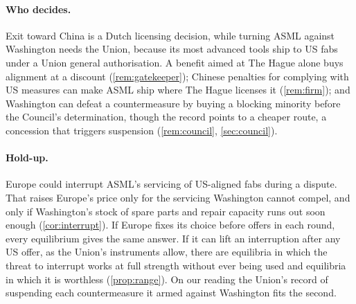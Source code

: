 \paragraph{Who decides.} Exit toward China is a Dutch licensing decision, while turning ASML against Washington needs the Union, because its most advanced tools ship to US fabs under a Union general authorisation. A benefit aimed at The Hague alone buys alignment at a discount (\cref{rem:gatekeeper}); Chinese penalties for complying with US measures can make ASML ship where The Hague licenses it (\cref{rem:firm}); and Washington can defeat a countermeasure by buying a blocking minority before the Council's determination, though the record points to a cheaper route, a concession that triggers suspension (\cref{rem:council}, \cref{sec:council}).

\paragraph{Hold-up.} Europe could interrupt ASML's servicing of US-aligned fabs during a dispute. That raises Europe's price only for the servicing Washington cannot compel, and only if Washington's stock of spare parts and repair capacity runs out soon enough (\cref{cor:interrupt}). If Europe fixes its choice before offers in each round, every equilibrium gives the same answer. If it can lift an interruption after any US offer, as the Union's instruments allow, there are equilibria in which the threat to interrupt works at full strength without ever being used and equilibria in which it is worthless (\cref{prop:range}). On our reading the Union's record of suspending each countermeasure it armed against Washington fits the second.
